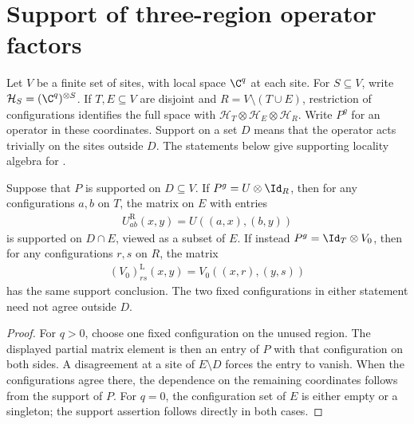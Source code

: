 \section{Support of three-region operator factors}

Let $V$ be a finite set of sites, with local space $\C^q$ at each site.
For $S\subseteq V$, write $\mathcal H_S=(\C^q)^{\otimes S}$.
If $T,E\subseteq V$ are disjoint and $R=V\setminus(T\cup E)$,
restriction of configurations identifies the full space with
$\mathcal H_T\otimes\mathcal H_E\otimes\mathcal H_R$.
Write $P^g$ for an operator in these coordinates. Support on a set $D$
means that the operator acts trivially on the sites outside $D$.
The statements below give supporting locality algebra for
\cite[Proposition~5.7]{Arad2016RigorousRG}.

\begin{lemma}
    \label{thm:three_region_partial_support}
    \leanok
    Suppose that $P$ is supported on $D\subseteq V$.
    If $P^g=U\otimes \Id_R$, then for any configurations $a,b$ on $T$,
    the matrix on $E$ with entries
    \begin{align}
        U^{\mathrm R}_{ab}(x,y)=U((a,x),(b,y))
        \label{eq:three_region_left_partial}
    \end{align}
    is supported on $D\cap E$, viewed as a subset of $E$.
    If instead $P^g=\Id_T\otimes V_0$, then for any configurations $r,s$
    on $R$, the matrix
    \begin{align}
        (V_0)^{\mathrm L}_{rs}(x,y)=V_0((x,r),(y,s))
        \label{eq:three_region_right_partial}
    \end{align}
    has the same support conclusion. The two fixed configurations in either
    statement need not agree outside $D$.
\end{lemma}
\begin{proof}\leanok
    For $q>0$, choose one fixed configuration on the unused region.
    The displayed partial matrix element is then an entry of $P$ with that
    configuration on both sides. A disagreement at a site of $E\setminus D$
    forces the entry to vanish. When the configurations agree there, the
    dependence on the remaining coordinates follows from the support of $P$.
    For $q=0$, the configuration set of $E$ is either empty or a singleton;
    the support assertion follows directly in both cases.
\end{proof}

